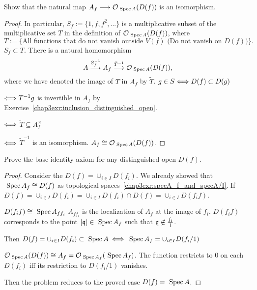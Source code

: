 \documentclass[11pt,fleqn]{book} %
\begin{document}
\begin{exr}\label{chap4exr:4.1.A}
Show that the natural map $A_f \longrightarrow {\cal O}_{\text{ Spec\,} A}(D(f))$ is an isomorphism.
\end{exr}
\begin{proof}
In particular, $S_f:=\{1,f,f^2,...\}$ is a multiplicative subset of the multiplicative set $T$ in the definition of ${\cal O}_{\text{ Spec\,} A}(D(f))$, where 
$$
T:=\{\text{All functions that do not vanish outside $V(f)$ (Do not vanish on $D(f))$}\}.
$$
$S_f\subset T$.
There is a natural homomorphism 
$$
A\overset{S_f^{-1}}{\longrightarrow}A_f\overset{\tilde{T}^{-1}}{\longrightarrow}{\cal O}_{\text{ Spec\,} A}(D(f)), 
$$
where we have denoted the image of $T$ in $A_f$ by $\tilde{T}$. $g\in S\Longleftrightarrow D(f)\subset D(g)$

$\Longleftrightarrow T^{-1}g$ is invertible in $A_f$ by Exercise~\ref{chap3exr:inclusion_distinguished_open}.

$\Longleftrightarrow$ $\tilde{T}\subseteq A_f^\times$

$\Longleftrightarrow$ $\tilde{T}^{-1}$ is an isomorphism. $A_f\cong {\cal O}_{\text{ Spec\,} A}(D(f))$.
\end{proof}

\begin{exr}
Prove the base identity axiom for any distinguished open $D(f)$. 
\end{exr}
\begin{proof}
Consider the $D(f)=\cup_{i\in I}D(f_i)$. We already showed that $\text{ Spec\,} A_f\cong D(f)$ as topological spaces~\ref{chap3exr:specA_f_and_specA/I}. If $D(f)=\cup_{i\in I}D(f_i)=\cup_{i\in I}D(f_i)\cap D(f)=\cup_{i\in I}D(f_if)$.

$D(f_i f)\cong\text{ Spec\,} A_{ff_i}$ $A_{ff_i}$ is the localization of $A_f$ at the image of $f_i$. $D(f_i f)$ corresponds to the point $[\mathfrak q]\in \text{ Spec\,} A_f$ such that $\mathfrak q\not\in \frac{f_i}{1}$.

Then $D(f)=\cup_{i\in I}D(f_i)\subset \text{ Spec\,} A$ $\Longleftrightarrow$ $\text{ Spec\,} A_f=\cup_{i\in I} D(f_i/1)$

${\cal O}_{\text{ Spec\,} A}(D(f))\cong A_f={\cal O}_{\text{ Spec\,} A_f}(\text{ Spec\,} A_f)$. The function restricts to $0$ on each $D(f_i)$ iff its restriction to $D(f_i/1)$ vanishes.

Then the problem reduces to the proved case $D(f)=\text{ Spec\,} A$.
\end{proof}
\end{document}
